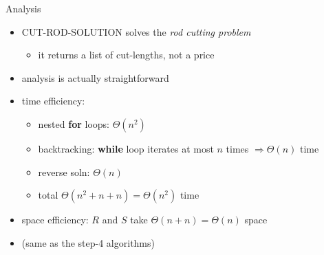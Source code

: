 \documentclass[10pt,aspectratio=169]{beamer}
\begin{document}
\begin{frame}{Analysis}
  \begin{itemize}
    \item CUT-ROD-SOLUTION solves the \emph{rod cutting problem}
    \begin{itemize}
      \item it returns a list of cut-lengths, not a price
    \end{itemize}
    \item analysis is actually straightforward
    \item time efficiency:
    \begin{itemize}
      \item nested \textbf{for} loops: $\Theta(n^2)$
      \item backtracking: \textbf{while} loop iterates at most $n$ times $\Rightarrow \Theta(n)$ time
      \item reverse soln: $\Theta(n)$
      \item total $\Theta(n^2+n+n)=\Theta(n^2)$ time
    \end{itemize}
    \item space efficiency: $R$ and $S$ take $\Theta(n+n)=\Theta(n)$ space
    \item (same as the step-4 algorithms)
  \end{itemize}
\end{frame}
\end{document}
